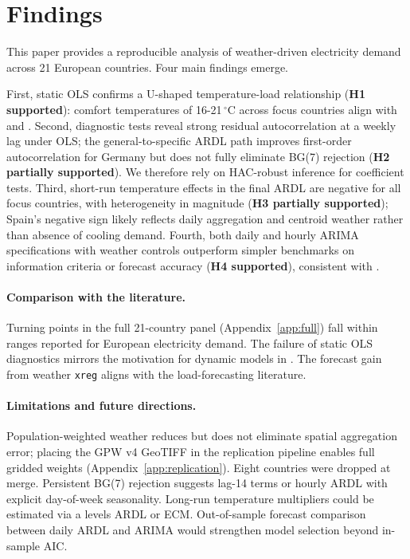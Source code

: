 \documentclass[12pt,a4paper]{article}
\begin{document}
\section{Findings}
\label{sec:findings}

This paper provides a reproducible analysis of weather-driven electricity demand across 21 European countries. Four main findings emerge.

\noindent First, static OLS confirms a U-shaped temperature-load relationship (\textbf{H1 supported}): comfort temperatures of 16-21\,$^\circ$C across focus countries align with \citet{bessec2008} and \citet{apadula2012}. Second, diagnostic tests reveal strong residual autocorrelation at a weekly lag under OLS; the general-to-specific ARDL path improves first-order autocorrelation for Germany but does not fully eliminate BG(7) rejection (\textbf{H2 partially supported}). We therefore rely on HAC-robust inference for coefficient tests. Third, short-run temperature effects in the final ARDL are negative for all focus countries, with heterogeneity in magnitude (\textbf{H3 partially supported}); Spain's negative sign likely reflects daily aggregation and centroid weather rather than absence of cooling demand. Fourth, both daily and hourly ARIMA specifications with weather controls outperform simpler benchmarks on information criteria or forecast accuracy (\textbf{H4 supported}), consistent with \citet{weron2014}.

\paragraph{Comparison with the literature.}
Turning points in the full 21-country panel (Appendix~\ref{app:full}) fall within ranges reported for European electricity demand. The failure of static OLS diagnostics mirrors the motivation for dynamic models in \citet{pesaran1997}. The forecast gain from weather \texttt{xreg} aligns with the load-forecasting literature.

\paragraph{Limitations and future directions.}
Population-weighted weather reduces but does not eliminate spatial aggregation error; placing the GPW v4 GeoTIFF in the replication pipeline enables full gridded weights (Appendix~\ref{app:replication}). Eight countries were dropped at merge. Persistent BG(7) rejection suggests lag-14 terms or hourly ARDL with explicit day-of-week seasonality. Long-run temperature multipliers could be estimated via a levels ARDL or ECM. Out-of-sample forecast comparison between daily ARDL and ARIMA would strengthen model selection beyond in-sample AIC.
\end{document}
